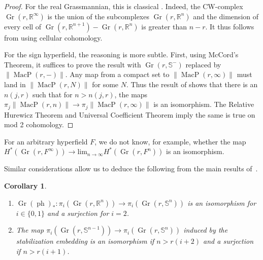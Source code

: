 \documentclass[10pt, preprint]{article}
\newtheorem{corollary}[theorem]{Corollary}
\theoremstyle{definition}
\begin{document}
\begin{proof}
For the real Grassmannian, this is classical
\cite{Milnor-Stasheff}. Indeed, the CW-complex $\operatorname{Gr}(r,
\mathbb{R}^{\infty })$ is the union of the subcomplexes $
\operatorname{Gr}(r,\mathbb{R}^{n})$ and the dimension of every cell of
$\operatorname{Gr}(r,\mathbb{R}^{n+1}) - \operatorname{Gr}(r,
\mathbb{R}^{n})$ is greater than $n-r$. It thus follows from using
cellular cohomology.

For the sign hyperfield, the reasoning is more subtle. First, using
McCord's Theorem, it suffices to prove the result with $
\operatorname{Gr}(r,\mathbb{S}^{-})$ replaced by $\|
\operatorname{MacP}(r, -) \|$. Any map from a compact set to
$\| \operatorname{MacP}(r, \infty ) \|$ must land in $\|
\operatorname{MacP}(r, N) \|$ for some $N$. Thus the result of
\cite{Anderson:homotopy} shows that there is an $n(j,r)$ such that for
$n > n(j,r)$, the maps $\pi _{j} \| \operatorname{MacP}(r, n) \|
\to \pi _{j} \| \operatorname{MacP}(r, \infty ) \|$ is an isomorphism.
The Relative Hurewicz Theorem and Universal Coefficient Theorem imply
the same is true on mod 2 cohomology.
\end{proof}

For an arbitrary hyperfield $F$, we do not know, for example, whether
the map $H^{*}(\operatorname{Gr}(r,F^{\infty })) \to \text{lim}_{n
\to \infty } H^{*}(\operatorname{Gr}(r,F^{n}))$ is an isomorphism.

Similar considerations allow us to deduce the following from the main
results of~\cite{Anderson:homotopy}.
%
\begin{corollary}
%
\begin{enumerate}[\textit{2.}]%
\item[\textit{1.}]
$\operatorname{Gr}(\operatorname{ph})_{*}:\pi _{i}(\operatorname{Gr}(r,
\mathbb{R}^{n}))\to \pi _{i}(\operatorname{Gr}(r, \mathbb{S}^{n}))$ is
an isomorphism for $i\in \{0,1\}$ and a surjection for $i=2$.
%
\item[\textit{2.}]
The map $\pi _{i}(\operatorname{Gr}(r,\mathbb{S}^{n-1}))\to \pi _{i}(
\operatorname{Gr}(r,\mathbb{S}^{n}))$ induced by the stabilization
embedding is an isomorphism if $n>r(i+2)$ and a surjection if
$n>r(i+1)$.
\end{enumerate}
%
\end{corollary}
\end{document}
